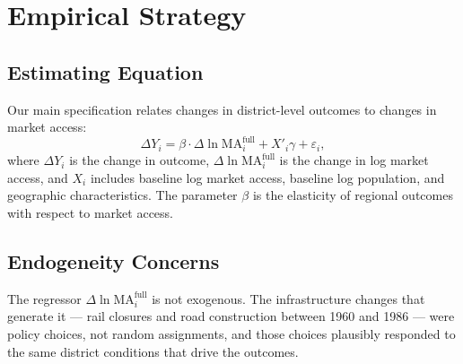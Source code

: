 %
%
%

\section{Empirical Strategy}
\label{sec:identification}

\subsection{Estimating Equation}

Our main specification relates changes in district-level outcomes to
changes in market access:
\begin{equation}
\Delta Y_i = \beta \cdot \Delta \ln \mathrm{MA}^{\mathrm{full}}_i
             + X'_i \gamma + \varepsilon_i,
\label{eq:main}
\end{equation}
where $\Delta Y_i$ is the change in outcome, $\Delta \ln
\mathrm{MA}^{\mathrm{full}}_i$ is the change in log market access, and
$X_i$ includes baseline log market access, baseline log population, and
geographic characteristics. The parameter $\beta$ is the elasticity of
regional outcomes with respect to market access.

\subsection{Endogeneity Concerns}

The regressor $\Delta \ln \mathrm{MA}^{\mathrm{full}}_i$ is not
exogenous. The infrastructure changes that generate it --- rail
closures and road construction between 1960 and 1986 --- were policy
choices, not random assignments, and those choices plausibly responded
to the same district conditions that drive the outcomes.

